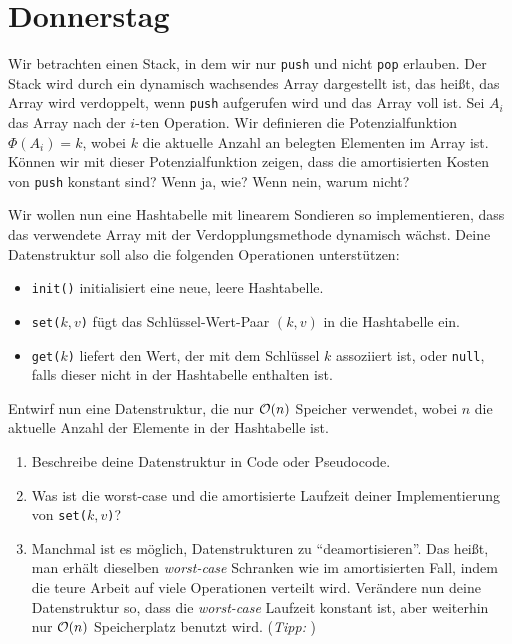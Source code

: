 \documentclass{uebung_cs}
\begin{document}
\section*{Donnerstag}
\begin{exercise}
    Wir betrachten einen Stack, in dem wir nur \texttt{push} und nicht \texttt{pop} erlauben. Der Stack wird durch ein dynamisch wachsendes Array dargestellt ist, das heißt, das Array wird verdoppelt, wenn \texttt{push} aufgerufen wird und das Array voll ist.
    Sei $A_i$ das Array nach der $i$-ten Operation.
    Wir definieren die Potenzialfunktion $\Phi(A_i) = k$, wobei $k$ die aktuelle Anzahl an belegten Elementen im Array ist.
    Können wir mit dieser Potenzialfunktion zeigen, dass die amortisierten Kosten von \texttt{push} konstant sind? Wenn ja, wie? Wenn nein, warum nicht?
\end{exercise}

\begin{exercise}
    Wir wollen nun eine Hashtabelle mit linearem Sondieren so implementieren, dass das verwendete Array mit der Verdopplungsmethode dynamisch wächst.
    Deine Datenstruktur soll also die folgenden Operationen unterstützen:
    \begin{itemize}
        \item \texttt{init()} initialisiert eine neue, leere Hashtabelle.
        \item \texttt{set($k,v$)} fügt das Schlüssel-Wert-Paar $(k,v)$ in die Hashtabelle ein.
        \item \texttt{get($k$)} liefert den Wert, der mit dem Schlüssel $k$ assoziiert ist, oder \texttt{null}, falls dieser nicht in der Hashtabelle enthalten ist.
    \end{itemize}
    Entwirf nun eine Datenstruktur, die nur $\mathcal{O}(n)$ Speicher verwendet, wobei $n$ die aktuelle Anzahl der Elemente in der Hashtabelle ist.
    \begin{enumerate}
        \item\athome Beschreibe deine Datenstruktur in Code oder Pseudocode.
        \item\athome Was ist die worst-case und die amortisierte Laufzeit deiner Implementierung von \texttt{set($k,v$)}?
        \item\atschool\note Manchmal ist es möglich, Datenstrukturen zu \enquote{deamortisieren}. Das heißt, man erhält dieselben \emph{worst-case} Schranken wie im amortisierten Fall, indem die teure Arbeit auf viele Operationen verteilt wird.
        Verändere nun deine Datenstruktur so, dass die \emph{worst-case} Laufzeit konstant ist, aber weiterhin nur $\mathcal{O}(n)$ Speicherplatz benutzt wird.
        (\emph{Tipp: })
    \end{enumerate}
\end{exercise}%
%
\end{document}
